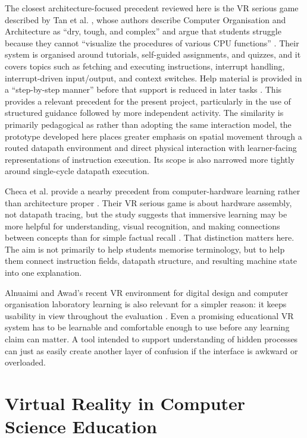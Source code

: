 The closest architecture-focused precedent reviewed here is the VR serious game described by Tan et al. \cite{tan2023vr}, whose authors describe Computer Organisation and Architecture as ``dry, tough, and complex'' and argue that students struggle because they cannot ``visualize the procedures of various CPU functions'' \cite{tan2023vr}. Their system is organised around tutorials, self-guided assignments, and quizzes, and it covers topics such as fetching and executing instructions, interrupt handling, interrupt-driven input/output, and context switches. Help material is provided in a ``step-by-step manner'' before that support is reduced in later tasks \cite{tan2023vr}. This provides a relevant precedent for the present project, particularly in the use of structured guidance followed by more independent activity. The similarity is primarily pedagogical as rather than adopting the same interaction model, the prototype developed here places greater emphasis on spatial movement through a routed datapath environment and direct physical interaction with learner-facing representations of instruction execution. Its scope is also narrowed more tightly around single-cycle datapath execution.

Checa et al. provide a nearby precedent from computer-hardware learning rather than architecture proper \cite{checa2023immersive}. Their VR serious game is about hardware assembly, not datapath tracing, but the study suggests that immersive learning may be more helpful for understanding, visual recognition, and making connections between concepts than for simple factual recall \cite{checa2023immersive}. That distinction matters here. The aim is not primarily to help students memorise terminology, but to help them connect instruction fields, datapath structure, and resulting machine state into one explanation.

Alnuaimi and Awad's recent VR environment for digital design and computer organisation laboratory learning is also relevant for a simpler reason: it keeps usability in view throughout the evaluation \cite{alnuaimi2025vr}. Even a promising educational VR system has to be learnable and comfortable enough to use before any learning claim can matter. A tool intended to support understanding of hidden processes can just as easily create another layer of confusion if the interface is awkward or overloaded.

\section{Virtual Reality in Computer Science Education}

